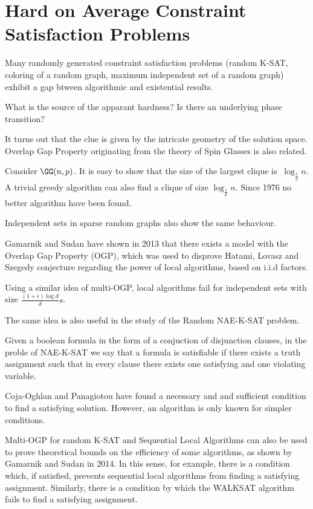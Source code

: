 \documentclass[11pt]{scrartcl}
\begin{document}
\section*{Hard on Average Constraint Satisfaction Problems}

Many randomly generated constraint satisfaction problems (random
K-SAT, coloring of a random graph, maximum independent set of a random
graph) exhibit a gap btween algorithmic and existential results.

What is the source of the apparant hardness? Is there an underlying phase transition?

It turns out that the clue is given by the intricate geometry of the
solution space. Overlap Gap Property originating from the theory of
Spin Glasses is also related.

Consider $\GG(n, p)$. It is easy to show that the size of the largest
clique is $~\log_{\frac{1}{p}}n$. A trivial greedy algorithm can also
find a clique of size $\log_{\frac{1}{p}}n$. Since 1976 no better
algorithm have been found.

Independent sets in sparse random graphs also show the same behaviour.

Gamarnik and Sudan have shown in 2013 that there exists a model with
the Overlap Gap Property (OGP), which was used to disprove Hatami,
Lovasz and Szegedy conjecture regarding the power of local algorithms,
based on i.i.d factors.

Using a similar idea of multi-OGP, local algorithms fail for
independent sets with size $\frac{(1+\epsilon)\log d}{d}s$.

The same idea is also useful in the study of the Random NAE-K-SAT problem.

Given a boolean formula in the form of a conjuction of disjunction
clauses, in the proble of NAE-K-SAT we say that a formula is
satisfiable if there exists a truth assignment such that in every
clause there exists one satisfying and one violating variable.

Coja-Oghlan and Panagiotou have found a necessary and and sufficient
condition to find a satisfying solution. However, an algorithm is only
known for simpler conditions.

Multi-OGP for random K-SAT and Sequential Local Algorithms can also be
used to prove theoretical bounds on the efficiency of some algorithms,
as shown by Gamarnik and Sudan in 2014. In this sense, for example,
there is a condition which, if satisfied, prevents sequential local
algorithms from finding a satisfying assignment. Similarly, there is a
condition by which the WALKSAT algorithm fails to find a satisfying
assignment.
\end{document}
